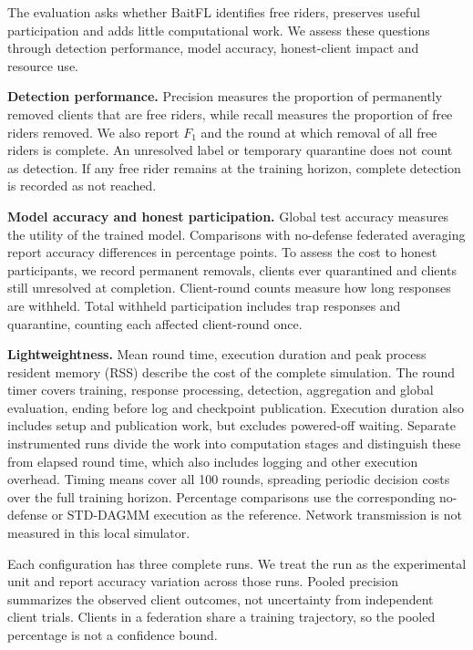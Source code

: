 \documentclass[journal]{IEEEtran}
\makeatletter
\renewcommand{\subsection}{\@startsection{subsection}{2}{\z@}{1.5ex}{0.7ex}{\normalfont\normalsize\itshape}}
\makeatother
\begin{document}
\subsection{Evaluation Metrics}
The evaluation asks whether BaitFL identifies free riders, preserves
useful participation and adds little computational work. We assess these
questions through detection performance, model accuracy, honest-client
impact and resource use.

\textbf{Detection performance.} Precision measures the proportion of
permanently removed clients that are free riders, while recall measures
the proportion of free riders removed. We also report $F_1$ and the round at which removal
of all free riders is complete. An unresolved label or temporary quarantine
does not count as detection. If any free rider remains at the training
horizon, complete detection is recorded as not reached.

\textbf{Model accuracy and honest participation.} Global test accuracy
measures the utility of the trained model. Comparisons with no-defense
federated averaging report accuracy differences in percentage points.
To assess the cost to honest participants, we record permanent removals,
clients ever quarantined and clients still unresolved at completion.
Client-round counts measure how long responses are withheld. Total
withheld participation includes trap responses and quarantine, counting
each affected client-round once.

\textbf{Lightweightness.} Mean round time, execution duration and peak
process resident memory (RSS) describe the cost of the complete simulation.
The round timer covers training, response processing, detection,
aggregation and global evaluation, ending before log and checkpoint
publication. Execution duration also includes setup and publication work,
but excludes powered-off waiting. Separate instrumented runs divide the
work into computation stages and distinguish these from elapsed round
time, which also includes logging and other execution overhead. Timing means
cover all 100 rounds, spreading periodic decision costs over the full
training horizon. Percentage comparisons use the corresponding
no-defense or STD-DAGMM execution as the reference. Network transmission
is not measured in this local simulator.

Each configuration has three complete runs. We treat the run as the
experimental unit and report accuracy variation across those runs.
Pooled precision summarizes the observed client outcomes, not uncertainty
from independent client trials. Clients in a federation share a training
trajectory, so the pooled percentage is not a confidence bound.
\end{document}
